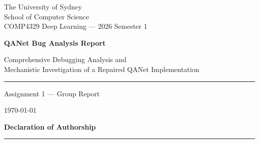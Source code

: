 \documentclass[10pt]{article}
\begin{document}
\begin{titlepage}
\thispagestyle{empty}
\begin{center}

\vspace*{2cm}

{\fontsize{11}{14}\selectfont\color{MetaGray}
The University of Sydney\\
School of Computer Science\\[0.8em]
COMP4329 Deep Learning --- 2026 Semester 1}

\vspace{2.5cm}

{\bfseries\fontsize{26}{32}\selectfont QANet Bug Analysis Report\par}

\vspace{0.8cm}

{\fontsize{14}{18}\selectfont
Comprehensive Debugging Analysis and\\
Mechanistic Investigation of a Repaired QANet Implementation\par}

\vspace{1.2cm}

{\color{SectionRule}\rule{0.6\linewidth}{0.8pt}\par}

\vspace{1.5cm}

{\fontsize{12}{16}\selectfont
Assignment 1 --- Group Report\par}

\vspace{\fill}

{\color{MetaGray}\fontsize{11}{14}\selectfont
\today\par}

\end{center}
\end{titlepage}

\setcounter{page}{2}

\thispagestyle{fancy}
\vspace*{1.5cm}
\begin{center}
{\bfseries\fontsize{18}{22}\selectfont Declaration of Authorship\par}
\vspace{0.5em}
{\color{SectionRule}\rule{0.5\linewidth}{0.6pt}\par}
\end{center}
\end{document}
